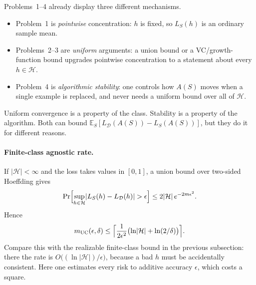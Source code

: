 \begin{remark}
\label{rem:mlu-three-routes}
Problems~1--4 already display three different mechanisms.
\begin{itemize}
    \item Problem~1 is \emph{pointwise} concentration: $h$ is fixed, so $L_S(h)$ is an ordinary sample mean.
    \item Problems~2--3 are \emph{uniform} arguments: a union bound or a VC/growth-function bound upgrades pointwise concentration to a statement about every $h\in\mathcal{H}$.
    \item Problem~4 is \emph{algorithmic stability}: one controls how $A(S)$ moves when a single example is replaced, and never needs a uniform bound over all of $\mathcal{H}$.
\end{itemize}
Uniform convergence is a property of the class. Stability is a property of the algorithm. Both can bound $\mathbb{E}_S[L_{\mathcal{D}}(A(S))-L_S(A(S))]$, but they do it for different reasons.
\end{remark}

\paragraph{Finite-class agnostic rate.}
If $\lvert\mathcal{H}\rvert<\infty$ and the loss takes values in $[0,1]$, a union bound over two-sided Hoeffding gives
\[
\Pr\Bigl[\sup_{h\in\mathcal{H}}\lvert L_S(h)-L_{\mathcal{D}}(h)\rvert>\epsilon\Bigr]
\le
2\lvert\mathcal{H}\rvert\,e^{-2m\epsilon^2}.
\]
Hence
\[
m_{\mathrm{UC}}(\epsilon,\delta)
\le
\Bigl\lceil\frac{1}{2\epsilon^2}\bigl(\ln\lvert\mathcal{H}\rvert+\ln(2/\delta)\bigr)\Bigr\rceil.
\]
Compare this with the realizable finite-class bound in the previous subsection: there the rate is $O\bigl((\ln\lvert\mathcal{H}\rvert)/\epsilon\bigr)$, because a bad $h$ must be accidentally consistent. Here one estimates every risk to additive accuracy $\epsilon$, which costs a square.

